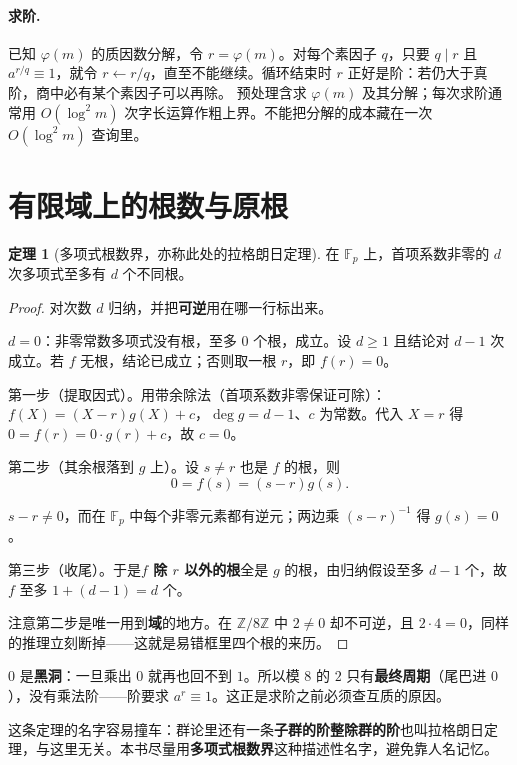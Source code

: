\documentclass[UTF8,a4paper,11pt,twoside,openright,fontset=fandol]{ctexbook}
\theoremstyle{definition}
\newtheorem{theorem}[definition]{定理}
\newcommand{\Z}{\mathbb Z}
\begin{document}
\paragraph{求阶.} 已知 $\varphi(m)$ 的质因数分解，令 $r=\varphi(m)$。对每个素因子 $q$，只要 $q\mid r$ 且 $a^{r/q}\equiv1$，就令 $r\gets r/q$，直至不能继续。循环结束时 $r$ 正好是阶：若仍大于真阶，商中必有某个素因子可以再除。
预处理含求 $\varphi(m)$ 及其分解；每次求阶通常用 $O(\log^2m)$ 次字长运算作粗上界。不能把分解的成本藏在一次 $O(\log^2m)$ 查询里。


\section{有限域上的根数与原根}
\begin{theorem}[多项式根数界，亦称此处的拉格朗日定理]
在 $\mathbb F_p$ 上，首项系数非零的 $d$ 次多项式至多有 $d$ 个不同根。
\end{theorem}
\begin{proof}
对次数 $d$ 归纳，并把\textbf{可逆}用在哪一行标出来。

$d=0$：非零常数多项式没有根，至多 $0$ 个根，成立。设 $d\ge1$ 且结论对 $d-1$ 次成立。若 $f$ 无根，结论已成立；否则取一根 $r$，即 $f(r)=0$。

第一步（提取因式）。用带余除法（首项系数非零保证可除）：$f(X)=(X-r)g(X)+c$，$\deg g=d-1$、$c$ 为常数。代入 $X=r$ 得 $0=f(r)=0\cdot g(r)+c$，故 $c=0$。

第二步（其余根落到 $g$ 上）。设 $s\ne r$ 也是 $f$ 的根，则
\[
 0=f(s)=(s-r)g(s).
\]




$s-r\ne0$，而在 $\mathbb F_p$ 中每个非零元素都有逆元；两边乘 $(s-r)^{-1}$ 得 $g(s)=0$。

第三步（收尾）。于是\textbf{$f$ 除 $r$ 以外的根}全是 $g$ 的根，由归纳假设至多 $d-1$ 个，故 $f$ 至多 $1+(d-1)=d$ 个。

注意第二步是唯一用到\textbf{域}的地方。在 $\Z/8\Z$ 中 $2\ne0$ 却不可逆，且 $2\cdot4=0$，同样的推理立刻断掉——这就是易错框里四个根的来历。
\end{proof}

\begin{tip}[图景：$0$ 是黑洞]
$0$ 是\textbf{黑洞}：一旦乘出 $0$ 就再也回不到 $1$。所以模 $8$ 的 $2$ 只有\textbf{最终周期}（尾巴进 $0$），没有乘法阶——阶要求 $a^r\equiv1$。这正是求阶之前必须查互质的原因。
\end{tip}


\begin{tip}
这条定理的名字容易撞车：群论里还有一条\textbf{子群的阶整除群的阶}也叫拉格朗日定理，与这里无关。本书尽量用\textbf{多项式根数界}这种描述性名字，避免靠人名记忆。
\end{tip}
\end{document}

